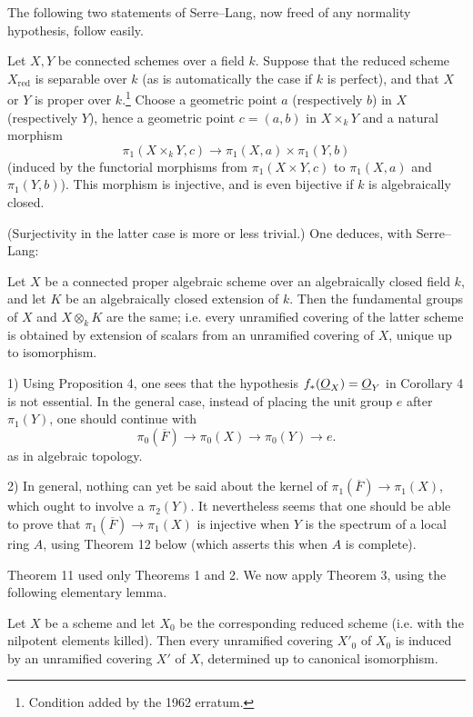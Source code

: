 The following two statements of Serre--Lang, now freed of any normality
hypothesis, follow easily.

 Let $X,Y$ be connected schemes over a field $k$. Suppose
that the reduced scheme $X_{\mathrm{red}}$ is separable over $k$ (as is
automatically the case if $k$ is perfect), and that $X$ or $Y$ is proper over
$k$.\footnote{Condition added by the 1962 erratum.} Choose a geometric
point $a$ (respectively $b$) in $X$ (respectively $Y$), hence a geometric point
$c=(a,b)$ in $X\times_kY$ and a natural morphism
\[
  \pi_1(X\times_kY,c)\longrightarrow
  \pi_1(X,a)\times\pi_1(Y,b)
\]
(induced by the functorial morphisms from $\pi_1(X\times Y,c)$ to
$\pi_1(X,a)$ and $\pi_1(Y,b)$). This morphism is injective, and is even
bijective if $k$ is algebraically closed.

(Surjectivity in the latter case is more or less trivial.) One deduces, with
Serre--Lang:

 Let $X$ be a connected proper algebraic scheme over an algebraically closed field $k$, and let $K$ be an algebraically closed
extension of $k$. Then the fundamental groups of $X$ and $X\otimes_kK$ are
the same; i.e. every unramified covering of the latter scheme is obtained by
extension of scalars from an unramified covering of $X$, unique up to
isomorphism.


1) Using Proposition 4, one sees that the hypothesis
$f_*(\underline{O}_X)=\underline{O}_Y$ in Corollary 4 is not essential. In the general case,
instead of placing the unit group $e$ after $\pi_1(Y)$, one should continue
with
\[
  \pi_0(\overline F)\longrightarrow\pi_0(X)
  \longrightarrow\pi_0(Y)\longrightarrow e.
\]
as in algebraic topology.

2) In general, nothing can yet be said about the kernel of
$\pi_1(\overline F)\longrightarrow\pi_1(X)$, which ought to involve a
$\pi_2(Y)$. It nevertheless seems that one should be able to prove that
$\pi_1(\overline F)\longrightarrow\pi_1(X)$ is injective when $Y$ is the
spectrum of a local ring $A$, using Theorem 12 below (which asserts this when
$A$ is complete).

Theorem 11 used only Theorems 1 and 2. We now apply Theorem 3, using the
following elementary lemma.

 Let $X$ be a scheme and let $X_0$ be the corresponding
reduced scheme (i.e. with the nilpotent elements killed). Then every
unramified covering $X'_0$ of $X_0$ is induced by an unramified covering $X'$
of $X$, determined up to canonical isomorphism.

